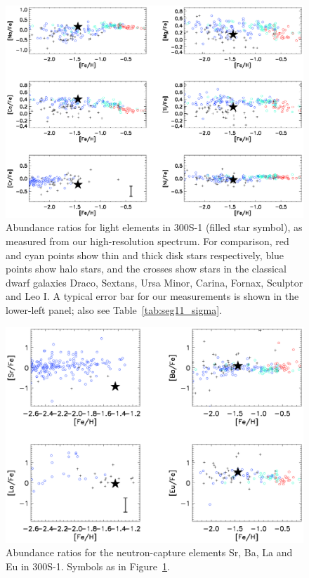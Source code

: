 \documentclass{emulateapj}
\begin{document}
\begin{figure}
 \begin{center}
  \includegraphics[width=17cm,clip=true,bbllx=40, bblly=362,bburx=555, bbury=705]{light_el.ps}
  \caption{Abundance ratios for light elements in 300S-1 (filled
    star symbol), as measured from our high-resolution spectrum. For
    comparison, red and cyan points show thin and thick disk stars
    respectively, blue points show halo stars, and the crosses show
    stars in the classical dwarf galaxies Draco, Sextans, Ursa Minor,
    Carina, Fornax, Sculptor and Leo I. A typical error bar for our
    measurements is shown in the lower-left panel; also see
    Table~\ref{tab:seg11_sigma}. }
  \label{fig:light_el}
 \end{center}
\end{figure} 


\begin{figure}
 \begin{center}
  \includegraphics[width=17cm,clip=true,bbllx=80, bblly=362,bburx=555, bbury=705]{nc_el.ps}
  \caption{Abundance ratios for the neutron-capture elements Sr, Ba,
    La and Eu in 300S-1. Symbols as in Figure~\ref{fig:light_el}.}
  \label{fig:nc_el}
 \end{center}
\end{figure} 
\end{document}
